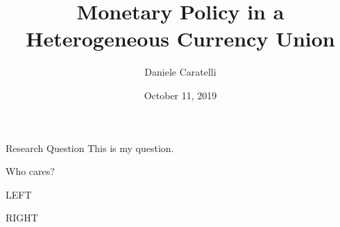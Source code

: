 \documentclass[12pt,aspectratio=169]{beamer}
\title{Monetary Policy in a Heterogeneous Currency Union}
\date{October 11, 2019}
\author{Daniele Caratelli}
\begin{document}
\maketitle

\begin{frame}{Research Question}
	This is my question.
\end{frame}


\begin{frame}{Who cares?}
	\begin{minipage}[t]{0.475\linewidth}
		LEFT
	\end{minipage}\pause
	\hfill%
	\begin{minipage}[t]{0.475\linewidth}
		RIGHT
	\end{minipage}
\end{frame}
\end{document}
